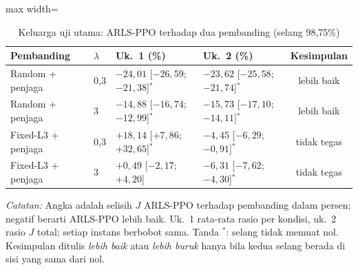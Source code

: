 \begin{table}[htbp]
\caption{Keluarga uji utama: ARLS-PPO terhadap dua pembanding (selang 98{,}75\%)}
\label{tab:uji-utama}
\centering\footnotesize
\setlength{\tabcolsep}{4pt}
\begin{adjustbox}{max width=\textwidth}
\begin{tabular}{llllc}
\toprule
Pembanding & $\lambda$ & Uk.~1 (\%) & Uk.~2 (\%) & Kesimpulan \\
\midrule
Random + penjaga & 0{,}3 & $-24{,}01$ [$-26{,}59$; $-21{,}38$]$^{*}$ & $-23{,}62$ [$-25{,}58$; $-21{,}74$]$^{*}$ & lebih baik \\
Random + penjaga & 3 & $-14{,}88$ [$-16{,}74$; $-12{,}99$]$^{*}$ & $-15{,}73$ [$-17{,}10$; $-14{,}11$]$^{*}$ & lebih baik \\
Fixed-L3 + penjaga & 0{,}3 & $+18{,}14$ [$+7{,}86$; $+32{,}65$]$^{*}$ & $-4{,}45$ [$-6{,}29$; $-0{,}91$]$^{*}$ & tidak tegas \\
Fixed-L3 + penjaga & 3 & $+0{,}49$ [$-2{,}17$; $+4{,}20$] & $-6{,}31$ [$-7{,}62$; $-4{,}30$]$^{*}$ & tidak tegas \\
\bottomrule
\end{tabular}
\end{adjustbox}
\par\smallskip\footnotesize\textit{Catatan:} Angka adalah selisih $J$ ARLS-PPO terhadap pembanding dalam persen; negatif berarti ARLS-PPO lebih baik. Uk.~1 rata-rata rasio per kondisi, uk.~2 rasio $J$ total; setiap instans berbobot sama. Tanda $^{*}$: selang tidak memuat nol. Kesimpulan ditulis \emph{lebih baik} atau \emph{lebih buruk} hanya bila kedua selang berada di sisi yang sama dari nol.
\end{table}
